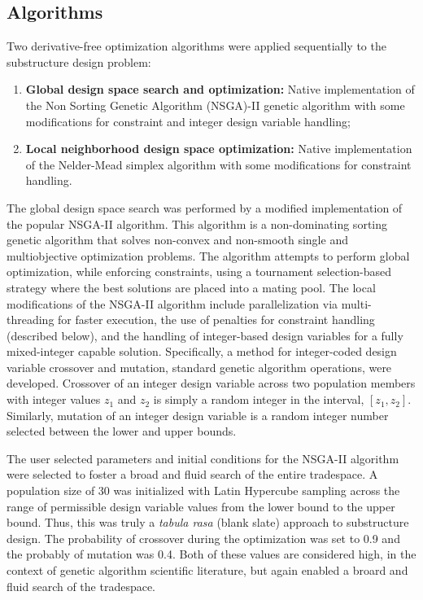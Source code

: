 \subsection{Algorithms}
Two derivative-free optimization algorithms were applied sequentially to
the substructure design problem:
\begin{enumerate}
\item \textbf{Global design space search and optimization:} Native
  implementation of the Non Sorting Genetic Algorithm (NSGA)-II genetic
  algorithm \citep{nsga2} with some modifications for constraint and
  integer design variable handling;
\item \textbf{Local neighborhood design space optimization:} Native
  implementation of the Nelder-Mead simplex algorithm \citep{neldermead}  with some
  modifications for constraint handling.
\end{enumerate}

The global design space search was performed by a modified
implementation of the popular NSGA-II \citep{nsga2} algorithm.  This algorithm is
a non-dominating sorting genetic algorithm that solves non-convex and
non-smooth single and multiobjective optimization problems. The
algorithm attempts to perform global optimization, while enforcing
constraints, using a tournament selection-based strategy where the best
solutions are placed into a mating pool.  The local modifications of the
NSGA-II algorithm include parallelization via multi-threading for faster
execution, the use of penalties for constraint handling (described
below), and the handling of integer-based design variables for a fully
mixed-integer capable solution.  Specifically, a method for
integer-coded design variable crossover and mutation, standard genetic
algorithm operations, were developed.  Crossover of an integer design
variable across two population members with integer values $z_1$ and
$z_2$ is simply a random integer in the interval, $[z_1, z_2]$.
Similarly, mutation of an integer design variable is a random integer
number selected between the lower and upper bounds.

The user selected parameters and initial conditions for the NSGA-II
algorithm were selected to foster a broad and fluid search of the entire
tradespace.  A population size of 30 was initialized with Latin
Hypercube sampling across the range of permissible design variable
values from the lower bound to the upper bound.  Thus, this was truly a
\textit{tabula rasa} (blank slate) approach to substructure design.  The
probability of crossover during the optimization was set to 0.9 and the
probably of mutation was 0.4.  Both of these values are considered high,
in the context of genetic algorithm scientific literature, but again
enabled a broard and fluid search of the tradespace.

